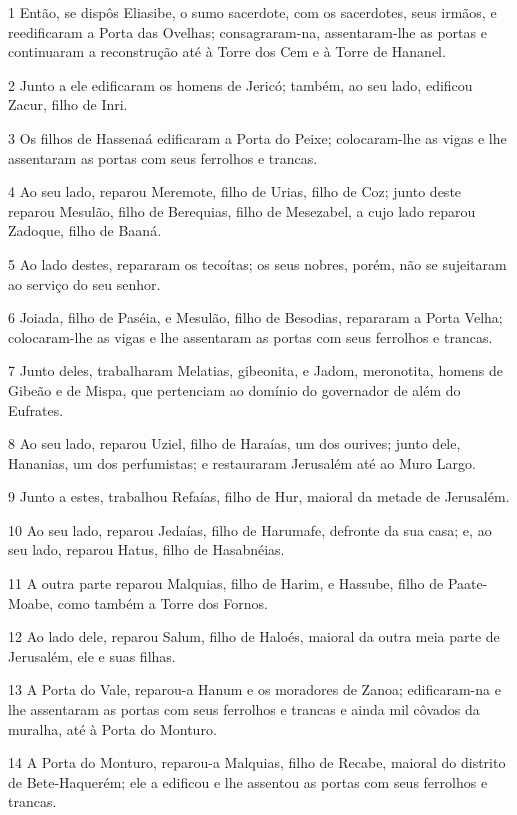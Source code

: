 \par 1 Então, se dispôs Eliasibe, o sumo sacerdote, com os sacerdotes, seus irmãos, e reedificaram a Porta das Ovelhas; consagraram-na, assentaram-lhe as portas e continuaram a reconstrução até à Torre dos Cem e à Torre de Hananel.
\par 2 Junto a ele edificaram os homens de Jericó; também, ao seu lado, edificou Zacur, filho de Inri.
\par 3 Os filhos de Hassenaá edificaram a Porta do Peixe; colocaram-lhe as vigas e lhe assentaram as portas com seus ferrolhos e trancas.
\par 4 Ao seu lado, reparou Meremote, filho de Urias, filho de Coz; junto deste reparou Mesulão, filho de Berequias, filho de Mesezabel, a cujo lado reparou Zadoque, filho de Baaná.
\par 5 Ao lado destes, repararam os tecoítas; os seus nobres, porém, não se sujeitaram ao serviço do seu senhor.
\par 6 Joiada, filho de Paséia, e Mesulão, filho de Besodias, repararam a Porta Velha; colocaram-lhe as vigas e lhe assentaram as portas com seus ferrolhos e trancas.
\par 7 Junto deles, trabalharam Melatias, gibeonita, e Jadom, meronotita, homens de Gibeão e de Mispa, que pertenciam ao domínio do governador de além do Eufrates.
\par 8 Ao seu lado, reparou Uziel, filho de Haraías, um dos ourives; junto dele, Hananias, um dos perfumistas; e restauraram Jerusalém até ao Muro Largo.
\par 9 Junto a estes, trabalhou Refaías, filho de Hur, maioral da metade de Jerusalém.
\par 10 Ao seu lado, reparou Jedaías, filho de Harumafe, defronte da sua casa; e, ao seu lado, reparou Hatus, filho de Hasabnéias.
\par 11 A outra parte reparou Malquias, filho de Harim, e Hassube, filho de Paate-Moabe, como também a Torre dos Fornos.
\par 12 Ao lado dele, reparou Salum, filho de Haloés, maioral da outra meia parte de Jerusalém, ele e suas filhas.
\par 13 A Porta do Vale, reparou-a Hanum e os moradores de Zanoa; edificaram-na e lhe assentaram as portas com seus ferrolhos e trancas e ainda mil côvados da muralha, até à Porta do Monturo.
\par 14 A Porta do Monturo, reparou-a Malquias, filho de Recabe, maioral do distrito de Bete-Haquerém; ele a edificou e lhe assentou as portas com seus ferrolhos e trancas.
